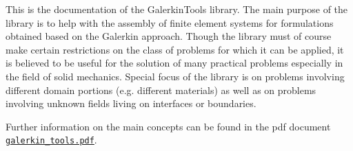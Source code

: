 This is the documentation of the Galerkin\+Tools library. The main purpose of the library is to help with the assembly of finite element systems for formulations obtained based on the Galerkin approach. Though the library must of course make certain restrictions on the class of problems for which it can be applied, it is believed to be useful for the solution of many practical problems especially in the field of solid mechanics. Special focus of the library is on problems involving different domain portions (e.\+g. different materials) as well as on problems involving unknown fields living on interfaces or boundaries.

Further information on the main concepts can be found in the pdf document \href{../notes/galerkin_tools.pdf}{\tt galerkin\+\_\+tools.\+pdf}. 